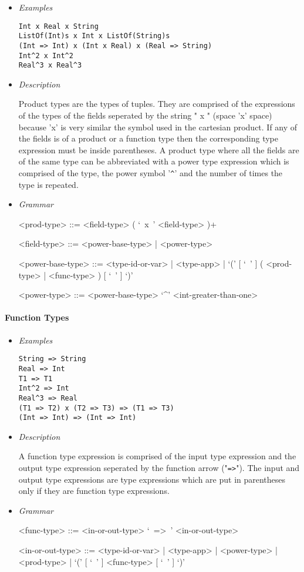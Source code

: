 \documentclass{article}
\begin{document}
\begin{itemize}
\item \textit{Examples}
\begin{verbatim}
Int x Real x String
ListOf(Int)s x Int x ListOf(String)s
(Int => Int) x (Int x Real) x (Real => String)
Int^2 x Int^2
Real^3 x Real^3
\end{verbatim}

\item \textit{Description}

Product types are the types of tuples. They are comprised of the expressions of
the types of the fields seperated by the string " x " (space 'x' space) because
'x' is very similar the symbol used in the cartesian product. If any of the
fields is of a product or a function type then the corresponding type
expression must be inside parentheses. A product type where all the fields are
of the same type can be abbreviated with a power type expression which is
comprised of the type, the power symbol '\texttt{\^}' and the number of times
the type is repeated.

\item \textit{Grammar}
\begin{grammar}
<prod-type> ::= <field-type> ( `\ x\ ' <field-type> )+

<field-type> ::= <power-base-type> | <power-type>

<power-base-type> ::=
<type-id-or-var> | <type-app> |
`(' [ `\ ' ] ( <prod-type> | <func-type> ) [ `\ ' ] `)'

<power-type> ::= <power-base-type> `^' <int-greater-than-one>
\end{grammar}
\end{itemize}

\paragraph{Function Types}

\begin{itemize}
\item \textit{Examples}
\begin{verbatim}
String => String 
Real => Int
T1 => T1
Int^2 => Int
Real^3 => Real
(T1 => T2) x (T2 => T3) => (T1 => T3)
(Int => Int) => (Int => Int)
\end{verbatim}

\item \textit{Description}

A function type expression is comprised of the input type expression and the
output type expression seperated by the function arrow ("\texttt{=>}"). The
input and output type expressions are type expressions which are put in
parentheses only if they are function type expressions. 

\item \textit{Grammar}
\begin{grammar}
<func-type> ::= <in-or-out-type> `\ =>\ ' <in-or-out-type>

<in-or-out-type> ::=
<type-id-or-var> | <type-app> | <power-type> | <prod-type> |
`(' [ `\ ' ] <func-type>  [ `\ ' ] `)'
\end{grammar}
\end{itemize}
\end{document}
